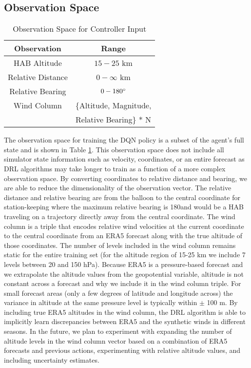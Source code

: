 \subsection{Observation Space}
\begin{table}[h]
\renewcommand{\arraystretch}{1.2}
\caption{Observation Space for Controller Input}
\centering
\begin{tabular}{|c|c|}
\hline
\bfseries Observation & \bfseries Range\\
\hline%
HAB Altitude & $15 - 25$ km\\
Relative Distance & $0 - \infty$ km\\
Relative Bearing & $0 - 180\degree$\\
Wind Column & \{Altitude, Magnitude, \\
            & Relative Bearing\} * N \\
\hline
\end{tabular}
\label{tab:observationspace}
\end{table}

The observation space for training the DQN policy is a subset of the agent's full state and is shown in Table \ref{tab:observationspace}. This observation space does not include all simulator state information such as velocity, coordinates, or an entire forecast as DRL algorithms may take longer to train as a function of a more complex observation space. By converting coordinates to relative distance and bearing, we are able to reduce the dimensionality of the observation vector.
The relative distance and relative bearing are from the balloon to the central coordinate for station-keeping where the maximum relative bearing is 180\degree and would be a HAB traveling on a trajectory directly away from the central coordinate. The wind column is a triple that encodes relative wind velocities at the current coordinate to the central coordinate from an ERA5 forecast along with the true altitude of those coordinates. The number of levels included in the wind column remains static for the entire training set (for the altitude region of 15-25 km we include 7 levels between 20 and 150 hPa). Because ERA5 is a pressure-based forecast and we extrapolate the altitude values from the geopotential variable, altitude is not constant across a forecast and why we include it in the wind column triple.  For small forecast areas (only a few degrees of latitude and longitude across) the variance in altitude at the same pressure level is typically within $\pm$ 100 m.  By including true ERA5 altitudes in the wind column, the DRL algorithm is able to implicitly learn discrepancies between ERA5 and the synthetic winds in different seasons.
In the future, we plan to experiment with expanding the number of altitude levels in the wind column vector based on a combination of ERA5 forecasts and previous actions, experimenting with relative altitude values, and including uncertainty estimates.

